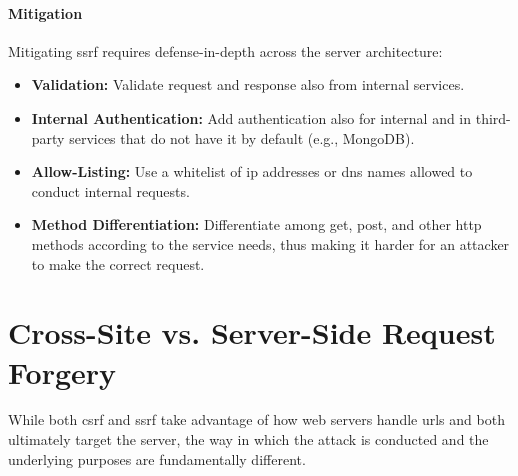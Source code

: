 \paragraph{ Mitigation}
Mitigating \gls{ssrf} requires defense-in-depth across the server architecture:
\begin{itemize}
    \item \textbf{Validation:} Validate request and response also from internal services.
    \item \textbf{Internal Authentication:} Add authentication also for internal and in third-party services that do not have it by default (e.g., MongoDB).
    \item \textbf{Allow-Listing:} Use a whitelist of \gls{ip} addresses or \gls{dns} names allowed to conduct internal requests.
    \item \textbf{Method Differentiation:} Differentiate among \gls{get}, \gls{post}, and other \gls{http} methods according to the service needs, thus making it harder for an attacker to make the correct request.
\end{itemize}

\section{Cross-Site vs. Server-Side Request Forgery}

While both \gls{csrf} and \gls{ssrf} take advantage of how web servers handle \glspl{url} and both ultimately target the server, the way in which the attack is conducted and the underlying purposes are fundamentally different.

